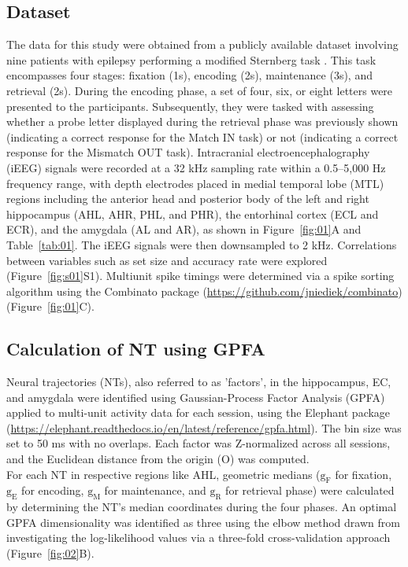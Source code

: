 \documentclass[final,3p,times,twocolumn]{elsarticle}
\begin{document}
\subsection{Dataset}
The data for this study were obtained from a publicly available dataset involving nine patients with epilepsy performing a modified Sternberg task \cite{boran_dataset_2020}. This task encompasses four stages: fixation (1s), encoding (2s), maintenance (3s), and retrieval (2s). During the encoding phase, a set of four, six, or eight letters were presented to the participants. Subsequently, they were tasked with assessing whether a probe letter displayed during the retrieval phase was previously shown (indicating a correct response for the Match IN task) or not (indicating a correct response for the Mismatch OUT task). Intracranial electroencephalography (iEEG) signals were recorded at a 32 kHz sampling rate within a 0.5--5,000 Hz frequency range, with depth electrodes placed in medial temporal lobe (MTL) regions including the anterior head and posterior body of the left and right hippocampus (AHL, AHR, PHL, and PHR), the entorhinal cortex (ECL and ECR), and the amygdala (AL and AR), as shown in Figure~\ref{fig:01}A and Table~\ref{tab:01}. The iEEG signals were then downsampled to 2 kHz. Correlations between variables such as set size and accuracy rate were explored (Figure~\ref{fig:s01}S1). Multiunit spike timings were determined via a spike sorting algorithm \cite{niediek_reliable_2016} using the Combinato package (\url{https://github.com/jniediek/combinato})(Figure~\ref{fig:01}C).

\subsection{Calculation of NT using GPFA}
Neural trajectories (NTs), also referred to as 'factors', in the hippocampus, EC, and amygdala were identified using Gaussian-Process Factor Analysis (GPFA) \cite{yu_gaussian-process_2009} applied to multi-unit activity data for each session, using the Elephant package (\url{https://elephant.readthedocs.io/en/latest/reference/gpfa.html}). The bin size was set to 50 ms with no overlaps. Each factor was Z-normalized across all sessions, and the Euclidean distance from the origin (O) was computed.
\\
\indent
For each NT in respective regions like AHL, geometric medians ($\mathrm{g_{F}}$ for fixation, $\mathrm{g_{E}}$ for encoding, $\mathrm{g_{M}}$ for maintenance, and $\mathrm{g_{R}}$ for retrieval phase) were calculated by determining the NT's median coordinates during the four phases. An optimal GPFA dimensionality was identified as three using the elbow method drawn from investigating the log-likelihood values via a three-fold cross-validation approach (Figure~\ref{fig:02}B).
\end{document}
